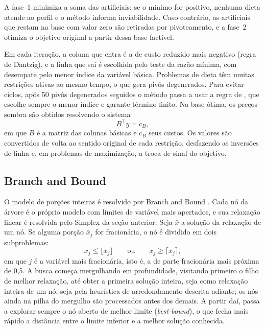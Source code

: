 \documentclass[12pt]{article}
\begin{document}
A fase~1 minimiza a soma das artificiais; se o mínimo for positivo, nenhuma dieta
atende ao perfil e o método informa inviabilidade. Caso contrário, as artificiais que
restam na base com valor zero são retiradas por pivoteamento, e a fase~2 otimiza o
objetivo original a partir dessa base factível.

Em cada iteração, a coluna que entra é a de custo reduzido mais negativo (regra de
Dantzig), e a linha que sai é escolhida pelo teste da razão mínima, com desempate pelo
menor índice da variável básica. Problemas de dieta têm muitas restrições ativas ao
mesmo tempo, o que gera pivôs degenerados. Para evitar ciclos, após 50 pivôs
degenerados seguidos o método passa a usar a regra de \cite{bland1977}, que escolhe
sempre o menor índice e garante término finito. Na base ótima, os preços-sombra são
obtidos resolvendo o sistema
\begin{equation}
B^\top y = c_B,
\label{eq:duais}
\end{equation}
em que $B$ é a matriz das colunas básicas e $c_B$ seus custos. Os valores são
convertidos de volta ao sentido original de cada restrição, desfazendo as inversões de
linha e, em problemas de maximização, a troca de sinal do objetivo.

\subsection{Branch and Bound}

O modelo de porções inteiras é resolvido por Branch and Bound \cite{landdoig1960}. Cada
nó da árvore é o próprio modelo com limites de variável mais apertados, e sua
relaxação linear é resolvida pelo Simplex da seção anterior. Seja $\bar{x}$ a solução da
relaxação de um nó. Se alguma porção $\bar{x}_j$ for fracionária, o nó é dividido em
dois subproblemas:
\begin{equation}
x_j \leq \lfloor \bar{x}_j \rfloor \qquad \text{ou} \qquad x_j \geq \lceil \bar{x}_j \rceil,
\label{eq:ramos}
\end{equation}
em que $j$ é a variável mais fracionária, isto é, a de parte fracionária mais próxima
de 0,5. A busca começa mergulhando em profundidade, visitando primeiro o filho de
melhor relaxação, até obter a primeira solução inteira, seja como relaxação inteira de
um nó, seja pela heurística de arredondamento descrita adiante; os nós ainda na pilha
do mergulho são processados antes dos demais. A partir daí, passa a
explorar sempre o nó aberto de melhor limite (\textit{best-bound}), o que fecha mais
rápido a distância entre o limite inferior e a melhor solução conhecida.
\end{document}
